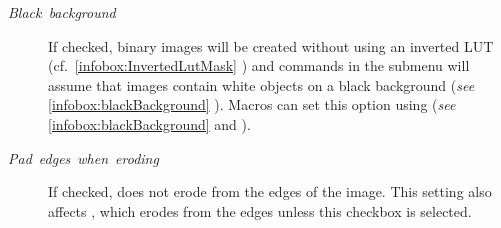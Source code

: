 \begin{minipage}[c][1\totalheight][t]{0.58\columnwidth}%
\begin{description}
\item [{\emph{Black\ background}}] If checked, binary images will be created
without using an inverted LUT (cf.\ \ref{infobox:InvertedLutMask}
) and commands
in the  submenu
will assume that images contain white objects on a black background
(\emph{see} \ref{infobox:blackBackground} ).
Macros can set this option using 
(\emph{see} \ref{infobox:blackBackground} 
and ).
\item [{\emph{Pad}\ \emph{edges}\ \emph{when}\ \emph{eroding}}] If checked,
 does not erode
from the edges of the image. This setting also affects ,
which erodes from the edges unless this checkbox is selected.\end{description}
%
\end{minipage}
